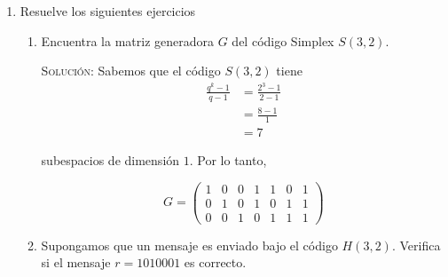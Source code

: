 \documentclass[letterpaper,11pt]{article}
\begin{document}
\begin{enumerate}
\begin{proof}
        Procedemos por contradicción. Supongamos que algunas $k$ columnas de 
        $G$ son linealmente dependientes. Sea $H$ la submatriz de 
        $k \times k$ formada por estas columnas. Como las columnas son 
        linealmente dependientes, entonces el rango de $H$ es menor que 
        $k$ debido a que los renglones de $H$ tienen alguna dependencia lineal. 
        Por lo tanto, existe una combinación lineal
        de los renglones de $H$ que suma $0$, por lo que podemos usar esta 
        misma combinación lineal en los renglones de $G$ cuya suma tiene al
        menos $k$ ceros, lo cual implicaría que tiene un peso de Hamming 
        $\leq n -k$. Pero como cualquier combinación lineal de los renglones
        de $G$ en un código $MDS$ debe tener un peso de Hamming al menos 
        $n-k+1$, entonces tenemos una contradicción.
        
        Por lo tanto, $C^{\top}$ es un código $MDS$.
        
    \end{proof}

    \item Resuelve los siguientes ejercicios
    \begin{enumerate}
        \item Encuentra la matriz generadora $G$ del código Simplex $S(3,2)$.
        
        \textsc{Solución:} Sabemos que el código $S(3,2)$ tiene 
        \begin{align*}
            \frac{q^{k}-1}{q-1} 
            &= \frac{2^{3}-1}{2-1} \\
            &= \frac{8-1}{1} \\
            &= 7
        \end{align*}
        
        subespacios de dimensión $1$. Por lo tanto, 

        \begin{equation*}
        G = 
        \begin{pmatrix}
        1 & 0 & 0 & 1 & 1 & 0 & 1\\
        0 & 1 & 0 & 1 & 0 & 1 & 1\\
        0 & 0 & 1 & 0 & 1 & 1 & 1
        \end{pmatrix}
        \end{equation*}
        
        \item Supongamos que un mensaje es enviado bajo el código $H(3,2)$.
        Verifica si el mensaje $r = 1010001$ es correcto. 
        

\end{enumerate}
\end{enumerate}
\end{document}
